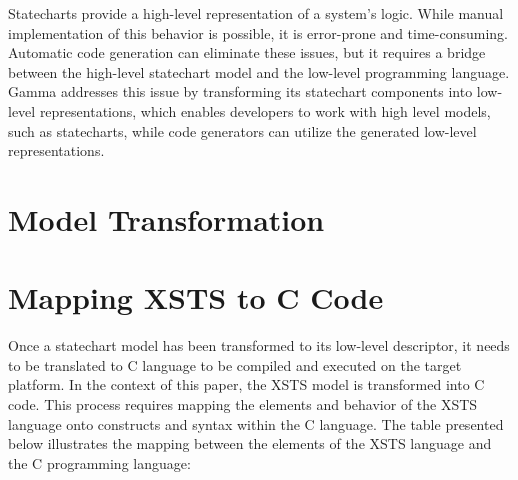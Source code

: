 Statecharts provide a high-level representation of a system's logic. While manual implementation of this behavior is possible, it is error-prone and time-consuming. Automatic code generation can eliminate these issues, but it requires a bridge between the high-level statechart model and the low-level programming language. Gamma addresses this issue by transforming its statechart components into low-level representations, which enables developers to work with high level models, such as statecharts, while code generators can utilize the generated low-level representations.

\section{Model Transformation}


\newpage

\section{Mapping XSTS to C Code}

Once a statechart model has been transformed to its low-level descriptor, it needs to be translated to C language to be compiled and executed on the target platform. In the context of this paper, the XSTS model is transformed into C code. This process requires mapping the elements and behavior of the XSTS language onto constructs and syntax within the C language. The table presented below illustrates the mapping between the elements of the XSTS language and the C programming language: \newline

